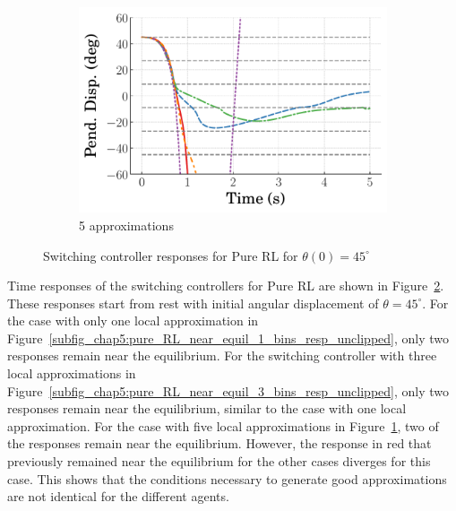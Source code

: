 \begin{figure}
\begin{subfigure}[b]{0.32\textwidth}
    \end{subfigure}
    \hfill
    \begin{subfigure}[b]{0.32\textwidth}
        \centering
        \includegraphics[width=\textwidth]{figures/figures_Interpretability/Mean_ISE_Inverted_Pendulum-v0_cubic_5_bins_near_equil/Curve_fit_time_responses/pure_RL/curve_fit_Pend_Disp_45.pdf}
        \caption{5 approximations}
        \label{subfig_chap5:pure_RL_near_equil_5_bins_resp_unclipped}
    \end{subfigure}
    \caption{Switching controller responses for Pure RL for $\theta(0)=45^\circ$}
    \label{fig_chap5:pure_RL_near_equil_45_resp_unclipped}
\end{figure}
%
Time responses of the switching controllers for Pure RL are shown in Figure~\ref{fig_chap5:pure_RL_near_equil_45_resp_unclipped}. These responses start from rest with initial angular displacement of $\theta=45^\circ$.
For the case with only one local approximation in Figure~\ref{subfig_chap5:pure_RL_near_equil_1_bins_resp_unclipped},
only two responses remain near the equilibrium.
%
For the switching controller with three local approximations in Figure~\ref{subfig_chap5:pure_RL_near_equil_3_bins_resp_unclipped}, only two responses remain near the equilibrium, similar to the case with one local approximation.
%
For the case with five local approximations in Figure~\ref{subfig_chap5:pure_RL_near_equil_5_bins_resp_unclipped}, two of the responses remain near the equilibrium.
However, the response in red that previously remained near the equilibrium for the other cases diverges for this case.
This shows that the conditions necessary to generate good approximations are not identical for the different agents.
